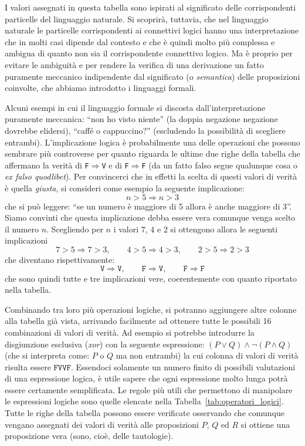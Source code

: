 \documentclass[italian,a4paper,hidelinks,headinclude]{scrartcl}
\newcommand{\myemph}[1]{\emph{#1}\marginpar{#1}}
\begin{document}
I valori assegnati in questa tabella sono ispirati al significato
delle corrispondenti particelle del linguaggio naturale. Si scoprirà,
tuttavia, che nel linguaggio naturale le particelle corrispondenti ai
connettivi logici hanno una interpretazione che in molti casi dipende
dal contesto e che è quindi molto più complessa e ambigua di quanto
non sia il corrispondente connettivo logico. Ma è proprio per evitare
le ambiguità e per rendere la verifica di una derivazione un fatto
puramente meccanico indipendente dal significato (o \myemph{semantica})
delle proposizioni coinvolte, che abbiamo introdotto i linguaggi
formali.

Alcuni esempi in cui il linguaggio formale si discosta
dall'interpretazione puramente meccanica: ``non ho visto niente''
(la doppia negazione negazione dovrebbe elidersi), ``caffé o cappuccino?''
(escludendo la possibilità di scegliere entrambi). L'implicazione
logica è probabilmente una delle operazioni che possono sembrare più
controverse per quanto riguarda le ultime due righe della tabella che
affermano la verità di \texttt{F}$\Rightarrow$\texttt{V} e di
\texttt{F}$\Rightarrow$\texttt{F} (da un fatto falso segue qualunque
cosa o \emph{ex falso quodlibet}). Per convincerci che in effetti la
scelta di questi valori di verità è quella \emph{giusta}, si consideri
come esempio
la seguente implicazione:
\[
n > 5 \Rightarrow n > 3
\]
che si può leggere: ``se un numero è maggiore di 5 allora è anche
maggiore di 3''. Siamo convinti che questa implicazione debba essere vera comunque
venga scelto il numero $n$. Scegliendo per $n$ i valori $7$, $4$ e $2$
si ottengono allora le seguenti implicazioni
\[
7 > 5 \Rightarrow 7>3, \qquad 4>5 \Rightarrow 4 > 3, \qquad 2>5
\Rightarrow 2>3
\]
che diventano rispettivamente:
\[
\texttt{V} \Rightarrow \texttt{V}, \qquad
\texttt{F} \Rightarrow \texttt{V}, \qquad
\texttt{F} \Rightarrow \texttt{F}
\]
che sono quindi tutte e tre implicazioni vere, coerentemente con
quanto riportato nella tabella.

Combinando tra loro più operazioni logiche, si potranno
aggiungere altre colonne alla tabella già vista, arrivando facilmente
ad ottenere tutte le possibili 16 combinazioni di valori di verità. Ad
esempio si potrebbe introdurre la disgiunzione esclusiva (\emph{xor})
con la seguente espressione: $(P \lor Q) \land \neg (P\land Q)$ (che
si interpreta come: $P$ o $Q$ ma non entrambi) la cui colonna di
valori di verità risulta essere $\texttt{FVVF}$. Essendoci solamente
un numero finito di possibili valutazioni di una espressione logica, è
utile sapere che ogni espressione molto lunga potrà essere certamente
semplificata. Le regole più utili che permettono di manipolare le
espressioni logiche sono quelle elencate nella Tabella~\ref{tab:operatori_logici}.
Tutte le righe della tabella possono essere verificate
osservando che comunque vengano assegnati dei valori di verità alle proposizioni
$P$, $Q$ ed $R$ si ottiene una proposizione vera (sono, cioè, delle tautologie).
\end{document}
